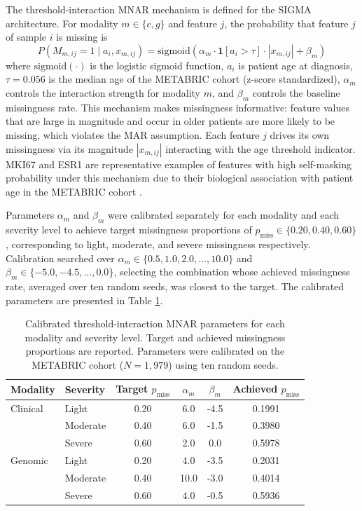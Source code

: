 \documentclass[final,3p,times,authoryear]{elsarticle}
\begin{document}
The threshold-interaction MNAR mechanism is defined for the SIGMA architecture. For modality $m \in \{c, g\}$ and feature $j$, the probability that feature $j$ of sample $i$ is missing is
\begin{equation}
P(M_{m,ij} = 1 \mid a_i, x_{m,ij}) = \text{sigmoid}\!\left(\alpha_m \cdot \mathbf{1}[a_i > \tau] \cdot |x_{m,ij}| + \beta_m\right)
\label{eq:mnar}
\end{equation}
where $\text{sigmoid}(\cdot)$ is the logistic sigmoid function, $a_i$ is patient age at diagnosis, $\tau = 0.056$ is the median age of the METABRIC cohort (z-score standardized), $\alpha_m$ controls the interaction strength for modality $m$, and $\beta_m$ controls the baseline missingness rate. This mechanism makes missingness informative: feature values that are large in magnitude and occur in older patients are more likely to be missing, which violates the MAR assumption. Each feature $j$ drives its own missingness via its magnitude $|x_{m,ij}|$ interacting with the age threshold indicator. MKI67 and ESR1 are representative examples of features with high self-masking probability under this mechanism due to their biological association with patient age in the METABRIC cohort \citep{qing2022molecular}.

Parameters $\alpha_m$ and $\beta_m$ were calibrated separately for each modality and each severity level to achieve target missingness proportions of $p_{\text{miss}} \in \{0.20, 0.40, 0.60\}$, corresponding to light, moderate, and severe missingness respectively. Calibration searched over $\alpha_m \in \{0.5, 1.0, 2.0, \ldots, 10.0\}$ and $\beta_m \in \{-5.0, -4.5, \ldots, 0.0\}$, selecting the combination whose achieved missingness rate, averaged over ten random seeds, was closest to the target. The calibrated parameters are presented in Table \ref{tab:mnar_params}.

\begin{table}[t]
\caption{Calibrated threshold-interaction MNAR parameters for each modality and severity level. Target and achieved missingness proportions are reported. Parameters were calibrated on the METABRIC cohort ($N = 1{,}979$) using ten random seeds.}
\label{tab:mnar_params}
\centering
{}
\begin{tabular}{llcccc}
\toprule
Modality & Severity & Target $p_{\text{miss}}$ & $\alpha_m$ & $\beta_m$ & Achieved $p_{\text{miss}}$ \\
\midrule
Clinical & Light & 0.20 & 6.0 & -4.5 & 0.1991 \\
 & Moderate & 0.40 & 6.0 & -1.5 & 0.3980 \\
 & Severe & 0.60 & 2.0 & 0.0 & 0.5978 \\
Genomic & Light & 0.20 & 4.0 & -3.5 & 0.2031 \\
 & Moderate & 0.40 & 10.0 & -3.0 & 0.4014 \\
 & Severe & 0.60 & 4.0 & -0.5 & 0.5936 \\
\bottomrule
\end{tabular}
\end{table}
\end{document}
